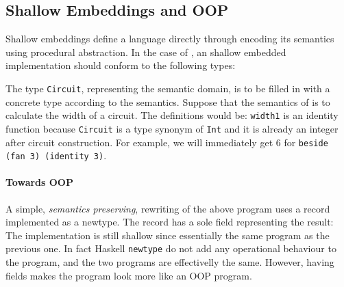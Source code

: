\subsection{Shallow Embeddings and OOP}
Shallow embeddings define a language directly through encoding its semantics
using procedural abstraction. In the case of \dsl,
an shallow embedded implementation should conform to the following types:

The type \lstinline{Circuit}, representing the semantic domain, is to be filled in with a concrete type according to the semantics.
Suppose that the semantics of \dsl is to calculate the width of a
circuit. The definitions would be:
\lstinline{width1} is an identity function because \lstinline{Circuit} is a type
synonym of \lstinline{Int} and it is already an integer after circuit construction.
For example, we will immediately get $6$ for \lstinline{beside (fan 3) (identity 3)}.

\begin{comment}

A simple rewriting of the previous program is to wrap the result into an
datatype, getting back the value through pattern matching:

\end{comment}

\paragraph{Towards OOP}
A simple, \emph{semantics preserving}, rewriting of the above program 
uses a record implemented as a newtype. The record has a sole field representing the result:
The implementation is still shallow since essentially the same program
as the previous one. In fact Haskell \lstinline{newtype} do not add any operational
behaviour to the program, and the two programs are effectivelly the
same.  However, having fields makes the program look more like an 
OOP program.

